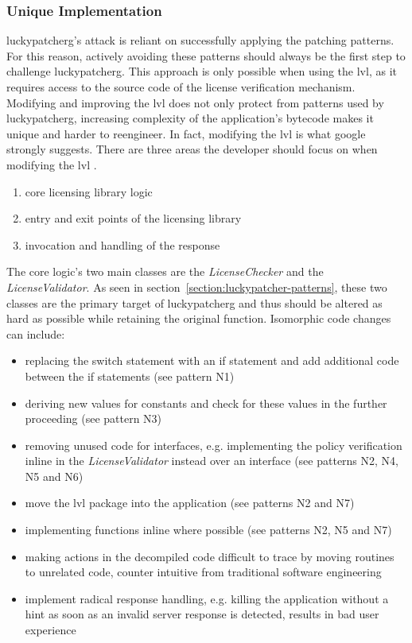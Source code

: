 \subsubsection{Unique Implementation} \label{subsection:counter-modifications-library}
\gls{luckypatcherg}'s attack is reliant on successfully applying the patching patterns.
For this reason, actively avoiding these patterns should always be the first step to challenge \gls{luckypatcherg}.
This approach is only possible when using the \gls{lvl}, as it requires access to the source code of the license verification mechanism.
Modifying and improving the \gls{lvl} does not only protect from patterns used by \gls{luckypatcherg}, increasing complexity of the application's bytecode makes it unique and harder to reengineer.
In fact, modifying the lvl is what google strongly suggests.\cite{developersSecuring}
\newline
There are three areas the developer should focus on when modifying the \gls{lvl}  \cite{developersSecuring}.
\begin{enumerate}
\item core licensing library logic
\item entry and exit points of the licensing library
\item invocation and handling of the response
\end{enumerate}
The core logic's two main classes are the \textit{LicenseChecker} and the \textit{LicenseValidator}.
As seen in section~\ref{section:luckypatcher-patterns}, these two classes are the primary target of \gls{luckypatcherg} and thus should be altered as hard as possible while retaining the original function.
Isomorphic code changes can include:
\begin{itemize}
\item replacing the switch statement with an if statement and add additional code between the if statements (see pattern N1)
\item deriving new values for constants and check for these values in the further proceeding (see pattern N3)
\item removing unused code for interfaces, e.g. implementing the policy verification inline in the \textit{LicenseValidator} instead over an interface (see patterns N2, N4, N5 and N6)
\item move the \gls{lvl} package into the application (see patterns N2 and N7)
\item implementing functions inline where possible (see patterns N2, N5 and N7)
\item making actions in the decompiled code difficult to trace by moving routines to unrelated code, counter intuitive from traditional software engineering
\item implement radical response handling, e.g. killing the application without a hint as soon as an invalid server response is detected, results in bad user experience
\end{itemize}
